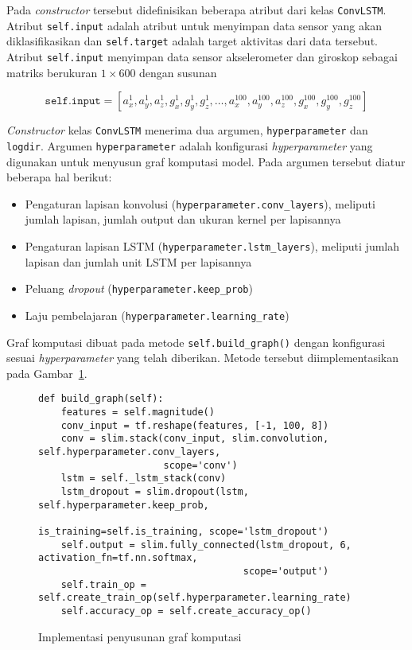 Pada \textit{constructor} tersebut didefinisikan beberapa atribut dari kelas \texttt{ConvLSTM}. Atribut \texttt{self.input} adalah atribut untuk menyimpan data sensor yang akan diklasifikasikan dan \texttt{self.target} adalah target aktivitas dari data tersebut. Atribut \texttt{self.input} menyimpan data sensor akselerometer dan giroskop sebagai matriks berukuran $1 \times 600$ dengan susunan

\begin{equation}
    \texttt{self.input} = [a_x^1, a_y^1, a_z^1, g_x^1, g_y^1, g_z^1,\dots, a_x^{100}, a_y^{100}, a_z^{100}, g_x^{100}, g_y^{100}, g_z^{100}]
    \label{eq:har-graph-input}
\end{equation}

\textit{Constructor} kelas \texttt{ConvLSTM} menerima dua argumen, \texttt{hyperparameter} dan \texttt{logdir}. Argumen \texttt{hyperparameter} adalah konfigurasi \textit{hyperparameter} yang digunakan untuk menyusun graf komputasi model. Pada argumen tersebut diatur beberapa hal berikut:

\begin{itemize}
    \item Pengaturan lapisan konvolusi (\texttt{hyperparameter.conv_layers}), meliputi jumlah lapisan, jumlah output dan ukuran kernel per lapisannya
    \item Pengaturan lapisan LSTM (\texttt{hyperparameter.lstm_layers}), meliputi jumlah lapisan dan jumlah unit LSTM per lapisannya
    \item Peluang \textit{dropout} (\texttt{hyperparameter.keep_prob})
    \item Laju pembelajaran (\texttt{hyperparameter.learning_rate})
\end{itemize}

Graf komputasi dibuat pada metode \texttt{self.build_graph()} dengan konfigurasi sesuai \textit{hyperparameter} yang telah diberikan. Metode tersebut diimplementasikan pada Gambar~\ref{listing:har-build-graph}.

\begin{figure}[h]
\begin{verbatim}
def build_graph(self):
    features = self.magnitude()
    conv_input = tf.reshape(features, [-1, 100, 8])
    conv = slim.stack(conv_input, slim.convolution, self.hyperparameter.conv_layers,
                      scope='conv')
    lstm = self._lstm_stack(conv)
    lstm_dropout = slim.dropout(lstm, self.hyperparameter.keep_prob,
                                is_training=self.is_training, scope='lstm_dropout')
    self.output = slim.fully_connected(lstm_dropout, 6, activation_fn=tf.nn.softmax,
                                    scope='output')
    self.train_op = self.create_train_op(self.hyperparameter.learning_rate)
    self.accuracy_op = self.create_accuracy_op()
\end{verbatim}
\caption{Implementasi penyusunan graf komputasi}
\label{listing:har-build-graph}
\end{figure}

